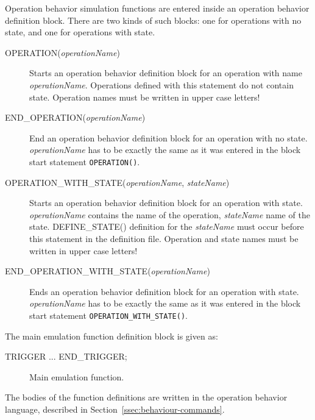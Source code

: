 \documentclass[twoside]{tceusermanual}
\begin{document}
Operation behavior simulation functions are entered inside an operation
behavior definition block. There are two kinds of such blocks: one for
operations with no state, and one for operations with state.

\begin{description}
\item[OPERATION(\emph{operationName})] %
  Starts an operation behavior definition block for an operation with name 
  \emph{operationName}. Operations defined with this statement do not 
  contain state. Operation names must be written in upper case letters!
\item[END\_OPERATION(\emph{operationName})] %
  End an operation behavior definition block for an operation with no state.
  \emph{operationName} has to be exactly the same as it was entered in the
  block start statement \verb|OPERATION()|.
\item[OPERATION\_WITH\_STATE(\emph{operationName}, \emph{stateName})] %
  Starts an operation behavior definition block for an operation with state.
  \emph{operationName} contains the name of the operation, \emph{stateName}
  name of the state. DEFINE\_STATE() definition for the \emph{stateName}
must 
  occur before this statement in the definition file. Operation and state
  names must be written in upper case letters!
\item[END\_OPERATION\_WITH\_STATE(\emph{operationName})] %
  Ends an operation behavior definition block for an operation with state.
  \emph{operationName} has to be exactly the same as it was entered in the
  block start statement \verb|OPERATION_WITH_STATE()|.
\end{description}

The main emulation  function definition block is given as:
\begin{description}
\item[TRIGGER ... END\_TRIGGER;] %
  Main emulation function.

\end{description}


The bodies of the function definitions are written in the operation behavior
language, described in Section~\ref{ssec:behaviour-commands}.
\end{document}
